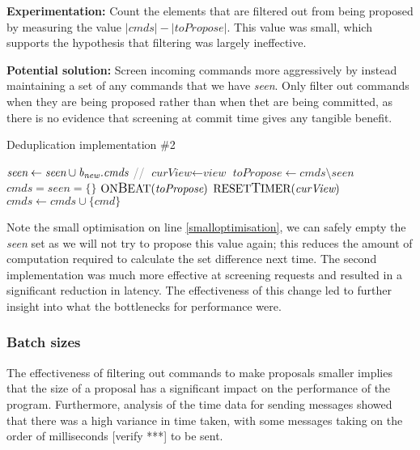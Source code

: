 \textbf{Experimentation: } Count the elements that are filtered out from being proposed by measuring the value $|\textit{cmds}| - |\textit{toPropose}|$. This value was small, which supports the hypothesis that filtering was largely ineffective.

\textbf{Potential solution: } Screen incoming commands more aggressively by instead maintaining a set of any commands that we have \textit{seen}. Only filter out commands when they are being proposed rather than when thet are being committed, as there is no evidence that screening at commit time gives any tangible benefit.

\begin{algorithm}[h!]
	\caption{Deduplication implementation \#2} \label{dedup2}
	\begin{algorithmic}[1]
			\State $ \textit{seen} \gets \textit{seen} \cup \textit{b\textsubscript{new}.cmds}$
			\State \textcolor{gray}{//}
		\EndIf
	\EndProcedure
		\State $ \textit{curView} \gets \textit{view}$
		\State $ \textit{toPropose} \gets \textit{cmds} \setminus \textit{seen}$
		\State $ \textit{cmds} = \textit{seen} = \{\}$ \label{smalloptimisation}
		\State $ \text{ON{\large B}EAT}(\textit{toPropose})$
		\State $ \text{RESET{\large T}IMER}(\textit{curView})$
	\EndProcedure
		\State $ \textit{cmds} \gets \textit{cmds} \cup \{\textit{cmd}\} $
	\EndProcedure
	\end{algorithmic}
\end{algorithm}

Note the small optimisation on line \ref{smalloptimisation}, we can safely empty the \textit{seen} set as we will not try to propose this value again; this reduces the amount of computation required to calculate the set difference next time. The second implementation was much more effective at screening requests and resulted in a significant reduction in latency. The effectiveness of this change led to further insight into what the bottlenecks for performance were.

\subsubsection{Batch sizes} \label{batchsizes}
The effectiveness of filtering out commands to make proposals smaller implies that the size of a proposal has a significant impact on the performance of the program. Furthermore, analysis of the time data for sending messages showed that there was a high variance in time taken, with some messages taking on the order of milliseconds [verify ***] to be sent.

